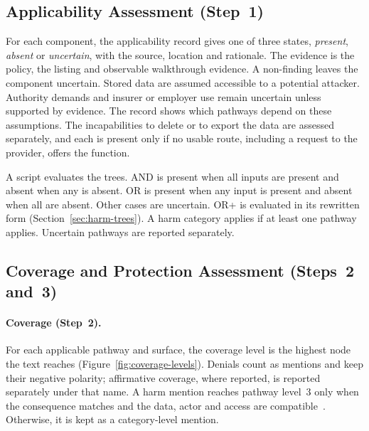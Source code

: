 \subsection{Applicability Assessment (Step~1)}
\label{sec:apply}
For each component, the applicability record gives one of three states, \emph{present},
\emph{absent} or \emph{uncertain}, with the source, location and rationale. The evidence is the
policy, the listing and observable walkthrough evidence. A non-finding leaves the component
uncertain. Stored data are assumed accessible to a potential attacker. Authority demands and
insurer or employer use remain uncertain unless supported by evidence. The record shows which
pathways depend on these assumptions. The incapabilities to delete or to export the data are
assessed separately, and each is present only if no usable route, including a request to the
provider, offers the function.

A script evaluates the trees. AND is present when all inputs are present and absent when any is
absent. OR is present when any input is present and absent when all are absent. Other cases are
uncertain. OR+ is evaluated in its rewritten form (Section~\ref{sec:harm-trees}). A harm
category applies if at least one pathway applies. Uncertain pathways are reported separately.

\subsection{Coverage and Protection Assessment (Steps~2 and~3)}
\label{sec:assessment}
\paragraph{Coverage (Step~2).} For each applicable pathway and surface, the coverage level is
the highest node the text reaches (Figure~\ref{fig:coverage-levels}). Denials count as mentions
and keep their negative polarity; affirmative coverage, where reported, is reported separately
under that name. A harm mention reaches pathway level~3 only when the consequence matches and the
data, actor and access are compatible~\parencite{shvartzshnaider2019going}. Otherwise, it is
kept as a category-level mention.

